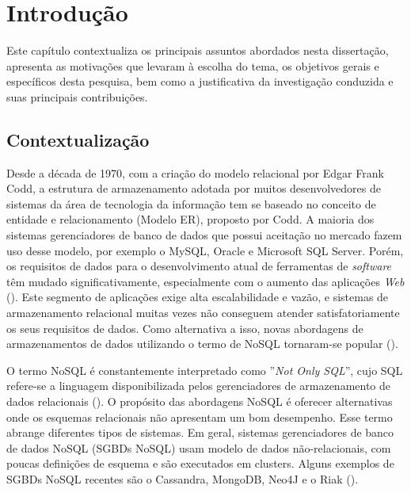 
\chapter{Introdução}
\label{chp:introduction}


\noindent Este capítulo contextualiza os principais assuntos abordados nesta dissertação, apresenta as motivações que levaram à escolha do tema, os objetivos gerais e específicos desta pesquisa, bem como a justificativa da investigação conduzida e suas principais contribuições.
\clearpage


\section{Contextualização}

Desde a década de 1970, com a criação do modelo relacional por Edgar Frank Codd, a estrutura de armazenamento adotada por muitos desenvolvedores de sistemas da área de tecnologia da informação tem se baseado no conceito de entidade e relacionamento (Modelo ER), proposto por Codd. A maioria dos sistemas gerenciadores de banco de dados que possui aceitação no mercado fazem uso desse modelo, por exemplo o MySQL, Oracle e Microsoft SQL Server. Porém, os requisitos de dados para o desenvolvimento atual de ferramentas de \textit{software} têm mudado significativamente, especialmente com o aumento das aplicações \textit{Web} (\cite{nasholm:2012}). Este segmento de aplicações exige alta escalabilidade e vazão, e sistemas de armazenamento relacional muitas vezes não conseguem atender satisfatoriamente os seus requisitos de dados. Como alternativa a isso, novas abordagens de armazenamentos de dados utilizando o termo de NoSQL tornaram-se popular (\cite{silva:2016}).

O termo NoSQL é constantemente interpretado como ''\emph{Not Only SQL}'', cujo SQL refere-se a linguagem disponibilizada pelos gerenciadores de armazenamento de dados relacionais (\cite{nasholm:2012}). O propósito das abordagens NoSQL é oferecer alternativas onde os esquemas relacionais não apresentam um bom desempenho. Esse termo abrange diferentes tipos de sistemas. Em geral, sistemas gerenciadores de banco de dados NoSQL (SGBDs NoSQL) usam modelo de dados não-relacionais, com poucas definições de esquema e são executados em clusters. Alguns exemplos de SGBDs NoSQL recentes são o Cassandra, MongoDB, Neo4J e o Riak (\cite{fowler:2013}).

